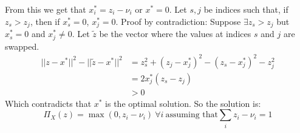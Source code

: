 \documentclass{article}
\begin{document}
From this we get that $x^*_i = z_i - \nu_i$ or $x^* = 0$. 
\newline
Let $s, j$ be indices such that, if $z_s > z_j$, then if $ x^*_s = 0$, $ x^*_j = 0$.
Proof by contradiction:
Suppose $\exists z_s > z_j$ but $x^*_s = 0$ and $x^*_j \neq 0$. Let $\tilde{z}$ be the vector where the values at indices $s$ and $j$ are swapped. 
\begin{align*}
	||z - x^*||^2 - ||\tilde{z} - x^*||^2 &= z_s^2 + (z_j - x_j^*)^2 - (z_s - x^*_j)^2 - z_j^2 \\
	&= 2x^*_j(z_s - z_j) \\
	&> 0
\end{align*}
Which contradicts that $x^*$ is the optimal solution. 
So the solution is:
\begin{equation*}
	\Pi_X(z) = \max(0, z_i - \nu_i) \ \forall i \ \text{assuming that} \sum_i{z_i - \nu_i} = 1
\end{equation*}
	
\end{document}
